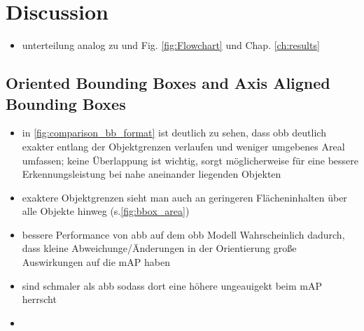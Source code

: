 \chapter{Discussion}
\label{ch:discussion}
\begin{itemize}
    \item unterteilung analog zu  und Fig. \ref{fig:Flowchart} und Chap. \ref{ch:results}
\end{itemize}

\section*{Oriented Bounding Boxes and Axis Aligned Bounding Boxes}
\begin{itemize}
    \item in \ref{fig:comparison_bb_format} ist deutlich zu sehen, dass \acrshort{obb} deutlich exakter entlang der Objektgrenzen verlaufen und weniger umgebenes Areal umfassen; keine Überlappung ist wichtig, sorgt möglicherweise für eine bessere Erkennungsleistung bei nahe aneinander liegenden Objekten
    \item exaktere Objektgrenzen sieht man auch an geringeren Flächeninhalten über alle Objekte hinweg (s.\ref{fig:bbox_area})
    \item bessere Performance von \acrshort{abb} auf dem \acrshort{obb} Modell Wahrscheinlich dadurch, dass kleine Abweichunge/Änderungen in der Orientierung große Auswirkungen auf die \acrshort{mAP} haben
    \item {} sind schmaler als \acrshort{abb} sodass dort eine höhere ungeauigekt beim \acrshort{mAP} herrscht
    \item {}
\end{itemize}



